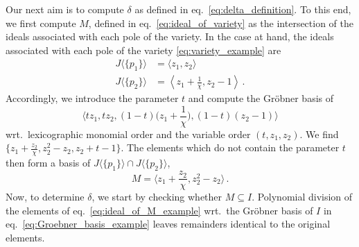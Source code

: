 \documentclass[dvipsnames,preprint,12pt,sort&compress]{elsarticle}
\begin{document}
Our next aim is to compute $\delta$ as defined in eq.~\eqref{eq:delta_definition}.
To this end, we first compute $M$, defined in eq.~\eqref{eq:ideal_of_variety}
as the intersection of the ideals associated with each pole of the variety.
In the case at hand, the ideals associated with each pole of the variety \eqref{eq:variety_example}
are
\begin{align}
J\langle \{p_1\}\rangle &= \langle z_1, z_2 \rangle \\
J\langle \{p_2\}\rangle &= \left\langle z_1 + \textstyle{\frac{1}{\chi}}, z_2 -1 \right\rangle \,.
\end{align}
Accordingly, we introduce the parameter $t$ and compute the Gr{\"o}bner basis of
\begin{equation}
\big\langle t z_1, t z_2, (1-t) \big(z_1 + \textstyle{\frac{1}{\chi}} \big), (1-t)(z_2 -1) \big\rangle
\end{equation}
wrt.~lexicographic monomial order and the variable order $(t, z_1, z_2)$. We find
$\{ z_1+\frac{z_2}{\chi}, z_2^2-z_2, z_2 + t - 1 \}$. The elements which do not contain
the parameter $t$ then form a basis of $J\langle \{p_1\}\rangle \cap J\langle \{p_2\}\rangle$,
\begin{equation}
M = \big\langle z_1 + \textstyle{\frac{z_2}{\chi}}, z_2^2-z_2 \big\rangle \,.
\label{eq:ideal_of_M_example}
\end{equation}
Now, to determine $\delta$, we start by checking whether $M \subseteq I$.
Polynomial division of the elements of eq.~\eqref{eq:ideal_of_M_example}
wrt.~the Gr{\"o}bner basis of $I$ in eq.~\eqref{eq:Groebner_basis_example}
leaves remainders identical to the original elements.
\end{document}
